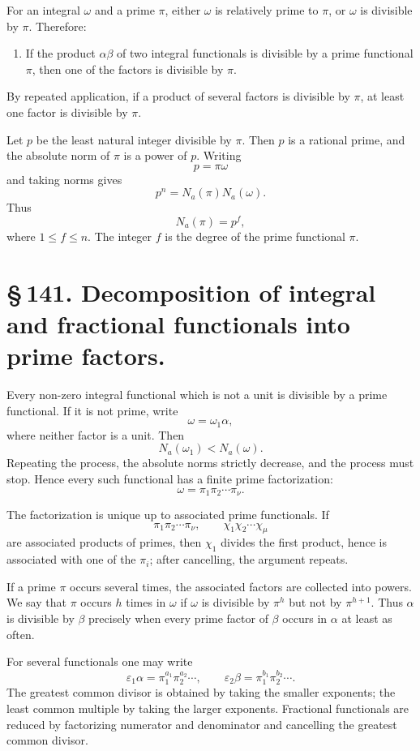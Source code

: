 \documentclass[11pt]{article}
\begin{document}
For an integral \(\omega\) and a prime \(\pi\), either \(\omega\) is
relatively prime to \(\pi\), or \(\omega\) is divisible by \(\pi\).
Therefore:
\begin{enumerate}[label=\arabic*.]
\item If the product \(\alpha\beta\) of two integral functionals is
divisible by a prime functional \(\pi\), then one of the factors is
divisible by \(\pi\).
\end{enumerate}
By repeated application, if a product of several factors is divisible
by \(\pi\), at least one factor is divisible by \(\pi\).

Let \(p\) be the least natural integer divisible by \(\pi\). Then
\(p\) is a rational prime, and the absolute norm of \(\pi\) is a power
of \(p\). Writing
\[
p=\pi\omega
\tag{1}
\]
and taking norms gives
\[
p^n=N_a(\pi)N_a(\omega).
\tag{2}
\]
Thus
\[
N_a(\pi)=p^f,
\tag{3}
\]
where \(1\leq f\leq n\). The integer \(f\) is the degree of the prime
functional \(\pi\).

\section*{\S\,141. Decomposition of integral and fractional functionals into prime factors.}

Every non-zero integral functional which is not a unit is divisible
by a prime functional. If it is not prime, write
\[
\omega=\omega_1\alpha,
\tag{1}
\]
where neither factor is a unit. Then
\[
N_a(\omega_1)<N_a(\omega).
\tag{2}
\]
Repeating the process, the absolute norms strictly decrease, and the
process must stop. Hence every such functional has a finite prime
factorization:
\[
\omega=\pi_1\pi_2\cdots\pi_\nu.
\tag{5}
\]

The factorization is unique up to associated prime functionals. If
\[
\pi_1\pi_2\cdots\pi_\nu,\qquad
\chi_1\chi_2\cdots\chi_\mu
\tag{6}
\]
are associated products of primes, then \(\chi_1\) divides the first
product, hence is associated with one of the \(\pi_i\); after
cancelling, the argument repeats.

If a prime \(\pi\) occurs several times, the associated factors are
collected into powers. We say that \(\pi\) occurs \(h\) times in
\(\omega\) if \(\omega\) is divisible by \(\pi^h\) but not by
\(\pi^{h+1}\). Thus \(\alpha\) is divisible by \(\beta\) precisely
when every prime factor of \(\beta\) occurs in \(\alpha\) at least as
often.

For several functionals one may write
\begin{equation}
\varepsilon_1\alpha=\pi_1^{a_1}\pi_2^{a_2}\cdots,\qquad
\varepsilon_2\beta=\pi_1^{b_1}\pi_2^{b_2}\cdots.
\tag{7}
\end{equation}
The greatest common divisor is obtained by taking the smaller
exponents; the least common multiple by taking the larger exponents.
Fractional functionals are reduced by factorizing numerator and
denominator and cancelling the greatest common divisor.
\end{document}
